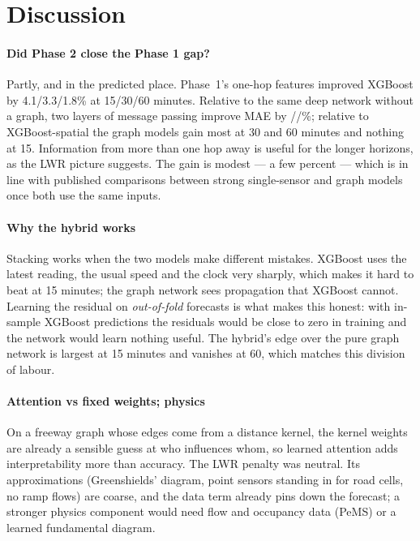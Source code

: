 \section{Discussion}
\paragraph{Did Phase 2 close the Phase 1 gap?} Partly, and in the predicted place. Phase~1's one-hop features improved XGBoost by 4.1/3.3/1.8\% at 15/30/60 minutes. Relative to the same deep network without a graph, two layers of message passing improve MAE by \pRelGatVsGruFifteen/\pRelGatVsGruThirty/\pRelGatVsGruSixty\%; relative to XGBoost-spatial the graph models gain most at 30 and 60 minutes and nothing at 15. Information from more than one hop away is useful for the longer horizons, as the LWR picture suggests. The gain is modest --- a few percent --- which is in line with published comparisons between strong single-sensor and graph models once both use the same inputs.

\paragraph{Why the hybrid works} Stacking works when the two models make different mistakes. XGBoost uses the latest reading, the usual speed and the clock very sharply, which makes it hard to beat at 15 minutes; the graph network sees propagation that XGBoost cannot. Learning the residual on \emph{out-of-fold} forecasts is what makes this honest: with in-sample XGBoost predictions the residuals would be close to zero in training and the network would learn nothing useful. The hybrid's edge over the pure graph network is largest at 15 minutes and vanishes at 60, which matches this division of labour.

\paragraph{Attention vs fixed weights; physics} On a freeway graph whose edges come from a distance kernel, the kernel weights are already a sensible guess at who influences whom, so learned attention adds interpretability more than accuracy. The LWR penalty was neutral. Its approximations (Greenshields' diagram, point sensors standing in for road cells, no ramp flows) are coarse, and the data term already pins down the forecast; a stronger physics component would need flow and occupancy data (PeMS) or a learned fundamental diagram.

